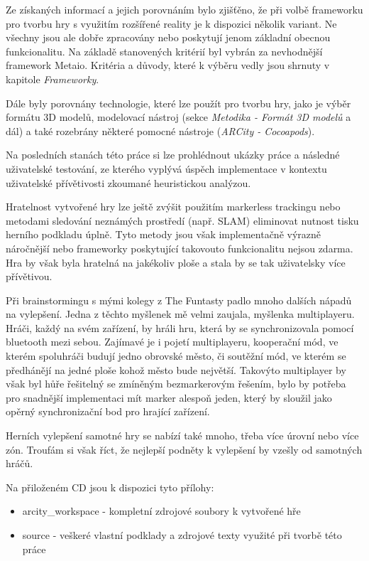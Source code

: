 \documentclass[twoside,12pt]{article}
\begin{document}
Ze získaných informací a jejich porovnáním bylo zjišťěno, že při volbě frameworku pro tvorbu hry s využitím rozšířené reality je k dispozici několik variant. Ne všechny jsou ale dobře zpracovány nebo poskytují jenom základní obecnou funkcionalitu. Na základě stanovených kritérií byl vybrán za nevhodnější framework Metaio. Kritéria a důvody, které k výběru vedly jsou shrnuty v kapitole \textit{Frameworky}. 

Dále byly porovnány technologie, které lze použít pro tvorbu hry, jako je výběr formátu 3D modelů, modelovací nástroj (sekce \textit{Metodika - Formát 3D modelů} a dál) a také rozebrány některé pomocné nástroje (\textit{ARCity - Cocoapods}).

Na posledních stanách této práce si lze prohlédnout ukázky práce a následné uživatelské testování, ze kterého vyplývá úspěch implementace v kontextu uživatelské přívětivosti zkoumané heuristickou analýzou. 

%
Hratelnost vytvořené hry lze ještě zvýšit použitím markerless trackingu nebo metodami sledování neznámých prostředí (např. SLAM) eliminovat nutnost tisku herního podkladu úplně. Tyto metody jsou však implementačně výrazně náročnější nebo frameworky poskytující takovouto funkcionalitu nejsou zdarma. Hra by však byla hratelná na jakékoliv ploše a stala by se tak uživatelsky více přívětivou.

Při brainstormingu s mými kolegy z The Funtasty padlo mnoho dalších nápadů na vylepšení. Jedna z těchto myšlenek mě velmi zaujala, myšlenka multiplayeru. Hráči, každý na svém zařízení, by hráli hru, která by se synchronizovala pomocí bluetooth mezi sebou. Zajímavé je i pojetí multiplayeru, kooperační mód, ve kterém spoluhráči budují jedno obrovské město, či soutěžní mód, ve kterém se předhánějí na jedné ploše kohož město bude největší. Takovýto multiplayer by však byl hůře řešitelný se zmíněným bezmarkerovým řešením, bylo by potřeba pro snadnější implementaci mít marker alespoň jeden, který by sloužil jako opěrný synchronizační bod pro hrající zařízení. 

Herních vylepšení samotné hry se nabízí také mnoho, třeba více úrovní nebo více zón. Troufám si však říct, že nejlepší podněty k vylepšení by vzešly od samotných hráčů. 

%
%
Na přiloženém CD jsou k dispozici tyto přílohy: 
\begin{itemize}
\item arcity\_workspace - kompletní zdrojové soubory k vytvořené hře
\item source - veškeré vlastní podklady a zdrojové texty využité při tvorbě této práce
\end{itemize}
\end{document}
